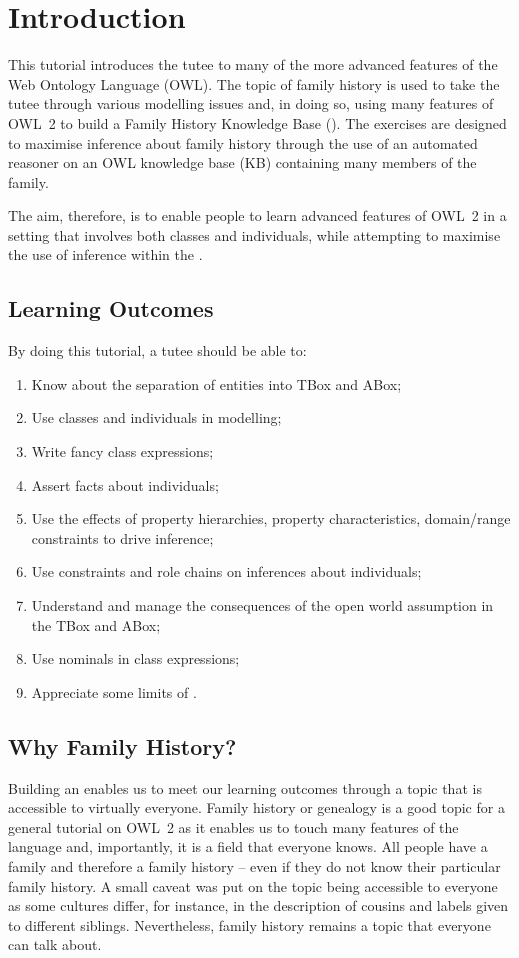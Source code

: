 \chapter{Introduction}
\label{chap:intro}
This tutorial introduces the tutee to many of the more advanced features of the Web Ontology Language (OWL). The topic of family history is used to take the tutee through various modelling issues and, in doing so, using many features of OWL~2 to build a Family History Knowledge Base (\fhkb). The exercises are designed  to maximise inference about family history through the use of an automated reasoner on an OWL knowledge base (KB) containing many members of the \stevens family.

The aim, therefore, is to enable people to learn advanced features of OWL~2 in a setting that involves both classes and individuals, while attempting to maximise the use of inference within the \fhkb.

\section{Learning Outcomes}

By doing this tutorial, a tutee should be able to:
\begin{enumerate}
\item Know about the separation of entities into TBox and ABox;
\item Use classes and individuals in modelling;
\item Write fancy class expressions;
\item Assert facts about individuals;
\item Use the effects of property hierarchies, property characteristics, domain/range  constraints to drive inference;
\item Use constraints and role chains on inferences about individuals;
\item Understand and manage the consequences of the open world assumption in the TBox and ABox;
\item Use nominals in class expressions;
\item Appreciate some limits of \owlii.
\end{enumerate}


\section{Why Family History?}

Building an \fhkb enables us to meet our learning outcomes through a topic that is accessible to virtually everyone. Family history or genealogy is a good topic for a general  tutorial on OWL~2 as it enables us to touch many features of the language and, importantly,  it is   a field that everyone knows. All people have a family and therefore a family history -- even if they do not know their particular family history. A small caveat was put on the topic being accessible to everyone as some cultures differ, for instance, in the description of cousins and labels given to different siblings. Nevertheless, family history remains a topic that everyone can talk about.

